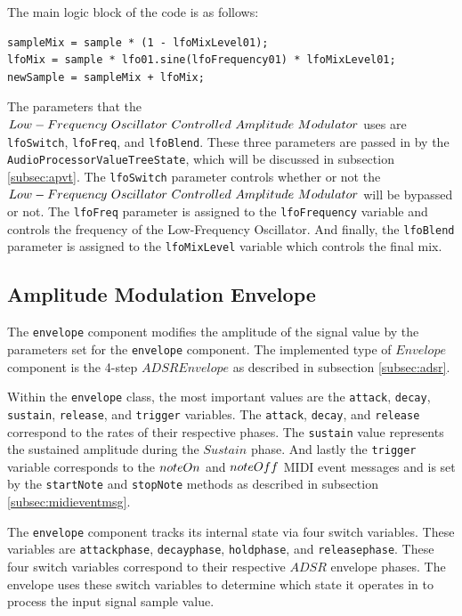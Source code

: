 \documentclass[a4paper,12pt]{report}
\begin{document}
The main logic block of the code is as follows:

 \noindent\begin{minipage}{\linewidth} \begin{lstlisting}[caption={LFO Mix},label={code:mixlevels},captionpos=b]
sampleMix = sample * (1 - lfoMixLevel01);
lfoMix = sample * lfo01.sine(lfoFrequency01) * lfoMixLevel01;
newSample = sampleMix + lfoMix;
\end{lstlisting} \end{minipage}

The parameters that the $Low-Frequency\ \-Oscillator\ \-Controlled\ \-Amplitude\ \-Modulator$ uses are \texttt{lfo\-Switch}, \texttt{lfo\-Freq}, and \texttt{lfo\-Blend}. These three parameters are passed in by the \texttt{Audio\-Processor\-Value\-Tree\-State}, which will be discussed in subsection \ref{subsec:apvt}. The \texttt{lfo\-Switch} parameter controls whether or not the $Low-Frequency\ \-Oscillator\ \-Controlled\ \-Amplitude\ \-Modulator$ will be bypassed or not. The \texttt{lfo\-Freq} parameter is assigned to the \texttt{lfo\-Frequency} variable and controls the frequency of the Low-Frequency Oscillator. And finally, the \texttt{lfo\-Blend} parameter is assigned to the \texttt{lfo\-Mix\-Level} variable which controls the final mix.

\subsection{Amplitude Modulation Envelope}
\label{subsec:amenv}
The \texttt{envelope} component modifies the amplitude of the signal value by the parameters set for the \texttt{envelope} component. The implemented type of $Envelope$ component is the 4-step $ADSR Envelope$ as described in subsection \ref{subsec:adsr}. 

Within the \texttt{envelope} class, the most important values are the \texttt{attack}, \texttt{decay}, \texttt{sustain}, \texttt{release}, and \texttt{trigger} variables. The \texttt{attack}, \texttt{decay}, and \texttt{release} correspond to the rates of their respective phases. The \texttt{sustain} value represents the sustained amplitude during the $Sustain$ phase. And lastly the \texttt{trigger} variable corresponds to the $note\-On$ and $note\-Off$ MIDI event messages and is set by the \texttt{start\-Note} and \texttt{stop\-Note} methods as described in subsection \ref{subsec:midieventmsg}.

The \texttt{envelope} component tracks its internal state via four switch variables. These variables are \texttt{attack\-phase}, \texttt{decay\-phase}, \texttt{hold\-phase}, and \texttt{release\-phase}. These four switch variables correspond to their respective $ADSR$ envelope phases. The envelope uses these switch variables to determine which state it operates in to process the input signal sample value. 
\end{document}
